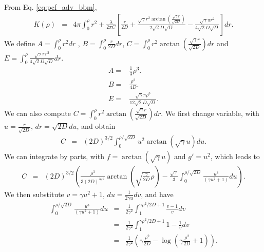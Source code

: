 \documentclass[12pt,english]{article}
\begin{document}
From Eq. \ref{eq:pcf_adv_bbm}, 
\begin{equation}
\begin{array}{ccc}
K(\rho) & = & 4\pi\int_{0}^{\rho}r^{2}+\frac{\lambda}{2\pi C}\left[\frac{r}{2D}+\frac{\sqrt{\gamma}r^{2}\arctan\left(\frac{\sqrt{\gamma}r}{\sqrt{2D}}\right)}{2\sqrt{2}D\sqrt{D}}-\frac{\sqrt{\gamma}\pi r^{2}}{4\sqrt{2}D\sqrt{D}}\right]dr.\end{array}\label{eq:start-K}
\end{equation}
We define $A=\int_{0}^{\rho}r^{2}dr$ , $B=\int_{0}^{\rho}\frac{r}{2D}dr$,
$C=\int_{0}^{\rho}r^{2}\arctan\left(\frac{\sqrt{\gamma}r}{\sqrt{2D}}\right)dr$
and $E=\int_{0}^{\rho}\frac{\sqrt{\gamma}\pi r^{2}}{4\sqrt{2}D\sqrt{D}}dr$.
\begin{equation}
\begin{array}{cc}
A= & \frac{1}{3}\rho^{3}.\\
B= & \frac{\rho^{2}}{4D}.\\
E= & \frac{\sqrt{\gamma}\pi\rho^{3}}{12\sqrt{2}D\sqrt{D}}.
\end{array}
\end{equation}
We can also compute $C=\int_{0}^{\rho}r^{2}\arctan\left(\frac{\sqrt{\gamma}r}{\sqrt{2D}}\right)dr$.
We first change variable, with $u=\frac{r}{\sqrt{2D}}$, $dr=\sqrt{2D}du$,
and obtain 
\begin{equation}
\begin{array}{ccc}
C & = & (2D)^{3/2}\int_{0}^{\rho/\sqrt{2D}}u^{2}\arctan(\sqrt{\gamma}u)du.\end{array}
\end{equation}
We can integrate by parts, with $f=\arctan(\sqrt{\gamma}u)$ and $g'=u^{2}$,
which leads to 
\begin{equation}
\begin{array}{ccc}
C & = & (2D)^{3/2}\left(\frac{\rho^{3}}{3(2D)^{3/2}}\arctan(\sqrt{\frac{\gamma}{2D}}\rho)-\frac{\sqrt{\gamma}}{3}\int_{0}^{\rho/\sqrt{2D}}\frac{u^{3}}{(\gamma u^{2}+1)}du\right).\end{array}
\end{equation}
We then substitute $v=\gamma u^{2}+1$, $du=\frac{1}{2\gamma u}dv$,
and have 
\begin{equation}
\begin{array}{ccc}
\int_{0}^{\rho/\sqrt{2D}}\frac{u^{3}}{(\gamma u^{2}+1)}du & = & \frac{1}{2\gamma^{2}}\int_{1}^{\gamma\rho^{2}/2D+1}\frac{v-1}{v}dv\\
 & = & \frac{1}{2\gamma^{2}}\int_{1}^{\gamma\rho^{2}/2D+1}1-\frac{1}{v}dv\\
 & = & \frac{1}{2\gamma^{2}}(\gamma\frac{\rho^{2}}{2D}-\log(\gamma\frac{\rho^{2}}{2D}+1)).
\end{array}
\end{equation}
\end{document}
